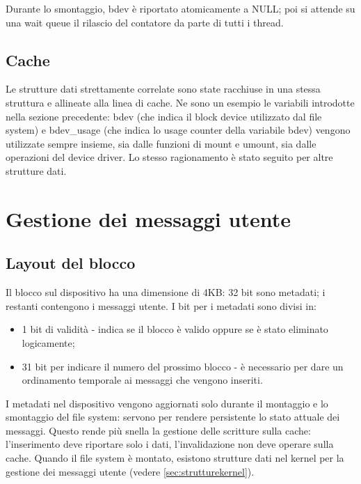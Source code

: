 \documentclass[a4paper,12pt,oneside]{book}
\begin{document}
\bigskip Durante lo smontaggio, bdev è riportato atomicamente a NULL; poi si attende su una wait queue il rilascio del contatore da parte di tutti i thread.



	\section{Cache}
	Le strutture dati strettamente correlate sono state racchiuse in una stessa struttura e allineate alla linea di cache. Ne sono un esempio le variabili introdotte nella sezione precedente: bdev (che indica il block device utilizzato dal file system) e bdev\_usage (che indica lo usage counter della variabile bdev) vengono utilizzate sempre insieme, sia dalle funzioni di mount e umount, sia dalle operazioni del device driver. Lo stesso ragionamento è stato seguito per altre strutture dati.








	\chapter{Gestione dei messaggi utente}
	
	\section{Layout del blocco}\label{sec:metadati}

	Il blocco sul dispositivo ha una dimensione di 4KB: 32 bit sono metadati; i restanti contengono i messaggi utente. I bit per i metadati sono divisi in:
\begin{itemize}
		\item 1 bit di validità - indica se il blocco è valido oppure se è stato eliminato logicamente;
		\item 31 bit per indicare il numero del prossimo blocco - è necessario per dare un ordinamento temporale ai messaggi che vengono inseriti.
\end{itemize}
I metadati  nel dispositivo vengono aggiornati solo durante il montaggio e lo smontaggio del file system: servono per rendere persistente lo stato attuale dei messaggi. Questo rende più snella la gestione delle scritture sulla cache: l'inserimento deve riportare solo i dati, l'invalidazione non deve operare sulla cache. Quando il file system è montato, esistono strutture dati nel kernel per la gestione dei messaggi utente (vedere \ref{sec:strutturekernel}).\\
\end{document}
